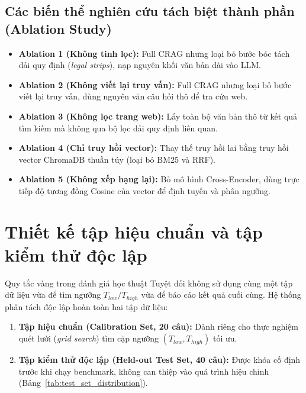 \subsection{Các biến thể nghiên cứu tách biệt thành phần (Ablation Study)}
\begin{itemize}
    \item \textbf{Ablation 1 (Không tinh lọc):} Full CRAG nhưng loại bỏ bước bóc tách dải quy định (\textit{legal strips}), nạp nguyên khối văn bản dài vào LLM.
    \item \textbf{Ablation 2 (Không viết lại truy vấn):} Full CRAG nhưng loại bỏ bước viết lại truy vấn, dùng nguyên văn câu hỏi thô để tra cứu web.
    \item \textbf{Ablation 3 (Không lọc trang web):} Lấy toàn bộ văn bản thô từ kết quả tìm kiếm mà không qua bộ lọc dải quy định liên quan.
    \item \textbf{Ablation 4 (Chỉ truy hồi vector):} Thay thế truy hồi lai bằng truy hồi vector ChromaDB thuần túy (loại bỏ BM25 và RRF).
    \item \textbf{Ablation 5 (Không xếp hạng lại):} Bỏ mô hình Cross-Encoder, dùng trực tiếp độ tương đồng Cosine của vector để định tuyến và phân ngưỡng.
\end{itemize}

\section{Thiết kế tập hiệu chuẩn và tập kiểm thử độc lập}

\begin{calloutbox}{Quy tắc vàng trong đánh giá học thuật}
Tuyệt đối không sử dụng cùng một tập dữ liệu vừa để tìm ngưỡng $T_{low}/T_{high}$ vừa để báo cáo kết quả cuối cùng. Hệ thống phân tách độc lập hoàn toàn hai tập dữ liệu:
\end{calloutbox}

\begin{enumerate}
    \item \textbf{Tập hiệu chuẩn (Calibration Set, 20 câu):} Dành riêng cho thực nghiệm quét lưới (\textit{grid search}) tìm cặp ngưỡng $(T_{low}, T_{high})$ tối ưu.
    \item \textbf{Tập kiểm thử độc lập (Held-out Test Set, 40 câu):} Được khóa cố định trước khi chạy benchmark, không can thiệp vào quá trình hiệu chỉnh (Bảng~\ref{tab:test_set_distribution}).
\end{enumerate}

